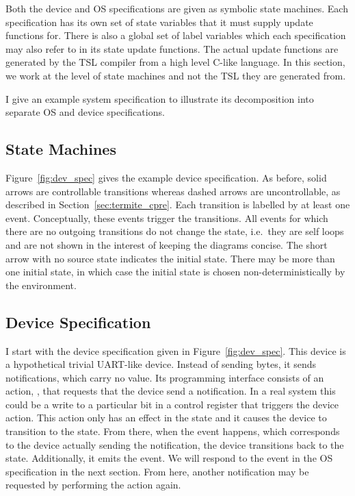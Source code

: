Both the device and OS specifications are given as symbolic state machines. Each specification has its own set of state variables that it must supply update functions for. There is also a global set of label variables which each specification may also refer to in its state update functions. The actual update functions are generated by the TSL compiler from a high level C-like language. In this section, we work at the level of state machines and not the TSL they are generated from.

I give an example system specification to illustrate its decomposition into separate OS and device specifications. 

\subsection{State Machines}

Figure~\ref{fig:dev_spec} gives the example device specification. As before, solid arrows are controllable transitions whereas dashed arrows are uncontrollable, as described in Section~\ref{sec:termite_cpre}. Each transition is labelled by at least one event. Conceptually, these events trigger the transitions. All events for which there are no outgoing transitions do not change the state, i.e.\ they are self loops and are not shown in the interest of keeping the diagrams concise. The short arrow with no source state indicates the initial state. There may be more than one initial state, in which case the initial state is chosen non-deterministically by the environment.

\subsection{Device Specification}

I start with the device specification given in Figure~\ref{fig:dev_spec}. This device is a hypothetical trivial UART-like device. Instead of sending bytes, it sends notifications, which carry no value. Its programming interface consists of an action, , that requests that the device send a notification. In a real system this could be a write to a particular bit in a control register that triggers the device action. This action only has an effect in the  state and it causes the device to transition to the  state. From there, when the  event happens, which corresponds to the device actually sending the notification, the device transitions back to the  state. Additionally, it emits the  event. We will respond to the  event in the OS specification in the next section. From here, another notification may be requested by performing the  action again.

